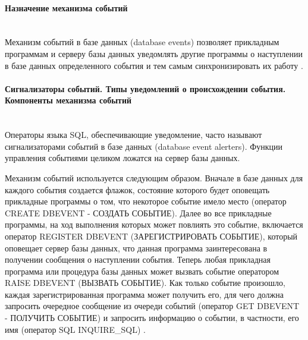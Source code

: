 \paragraph{Назначение механизма событий} ~\\

Механизм событий в базе данных (database events) позволяет прикладным программам и серверу базы данных уведомлять другие программы о наступлении в базе данных определенного события и тем самым синхронизировать их работу \autocite{OSP}.

\paragraph{Сигнализаторы событий. Типы уведомлений о происхождении события. Компоненты механизма событий} ~\\

Операторы языка SQL, обеспечивающие уведомление, часто называют сигнализаторами событий в базе данных (database event alerters). Функции управления событиями целиком ложатся на сервер базы данных.


Механизм событий используется следующим образом. Вначале в базе данных для каждого события создается флажок, состояние которого будет оповещать прикладные программы о том, что некоторое событие имело место (оператор CREATE DBEVENT - СОЗДАТЬ СОБЫТИЕ). Далее во все прикладные программы, на ход выполнения которых может повлиять это событие, включается оператор REGISTER DBEVENT (ЗАРЕГИСТРИРОВАТЬ СОБЫТИЕ), который оповещает сервер базы данных, что данная программа заинтересована в получении сообщения о наступлении события. Теперь любая прикладная программа или процедура базы данных может вызвать событие оператором RAISE DBEVENT (ВЫЗВАТЬ СОБЫТИЕ). Как только событие произошло, каждая зарегистрированная программа может получить его, для чего должна запросить очередное сообщение из очереди событий (оператор GET DBEVENT - ПОЛУЧИТЬ СОБЫТИЕ) и запросить информацию о событии, в частности, его имя (оператор SQL INQUIRE\_SQL) \autocite{OSP}.
